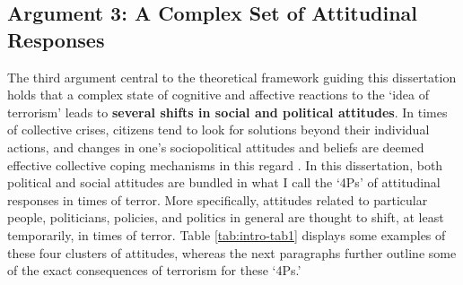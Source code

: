  
\subsection{Argument 3: A Complex Set of Attitudinal Responses}
\label{sec:123}
The third argument central to the theoretical framework guiding this dissertation holds that a complex state of cognitive and affective reactions to the `idea of terrorism' leads to\textbf{ several shifts in social and political attitudes}. In times of collective crises, citizens tend to look for solutions beyond their individual actions, and changes in one's sociopolitical attitudes and beliefs are deemed effective collective coping mechanisms in this regard \citep{Merolla2009a}. In this dissertation, both political and social attitudes are bundled in what I call the `4Ps' of attitudinal responses in times of terror. More specifically, attitudes related to particular people, politicians, policies, and politics in general are thought to shift, at least temporarily, in times of terror. Table \ref{tab:intro-tab1} displays some examples of these four clusters of attitudes, whereas the next paragraphs further outline some of the exact consequences of terrorism for these `4Ps.'



